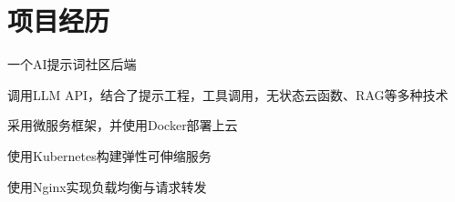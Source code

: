 \documentclass[]{deedy-resume-openfont}
\begin{document}
\begin{minipage}[t]{0.73\textwidth} 






\section{项目经历}
\sectionsep
{}
\sectionsep
\begin{tightemize}
    \item 一个AI提示词社区后端
    \item 调用LLM API，结合了提示工程，工具调用，无状态云函数、RAG等多种技术
    \item 采用微服务框架，并使用Docker部署上云
    \item 使用Kubernetes构建弹性可伸缩服务
    \item 使用Nginx实现负载均衡与请求转发
    \end{tightemize}
\sectionsep


\end{minipage}
\end{document}
